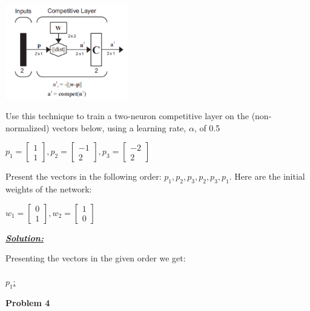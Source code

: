 \documentclass{article}
\begin{document}
\begin{center}
    \includegraphics[width=0.4\textwidth]{pr3.png}
\end{center}

\noindent Use this technique to train a two-neuron competitive layer on the (non-normalized) 
vectors below, using a learning rate, $\alpha$, of 0.5 

\begin{center}
    $p_1 = \begin{bmatrix}
        1\\
        1
      \end{bmatrix}, p_2 = \begin{bmatrix}
        -1\\
        2
      \end{bmatrix}, p_3 = \begin{bmatrix}
        -2 \\
        2
      \end{bmatrix}$
\end{center}

\noindent Present the vectors in the following order: $p_1, p_2, p_3, p_2, p_3, p_1$. 
Here are the initial weights of the network: 

\begin{center}
    $w_1 = \begin{bmatrix}
        0\\
        1
      \end{bmatrix}, w_2 = \begin{bmatrix}
        1\\
        0
      \end{bmatrix}$
      \vspace{1cm}
\end{center}

\noindent \underline{\textbf{\textit{Solution:}}}

\noindent Presenting the vectors in the given order we get: \\\\ \underline{$p_1$:}


\newpage
\noindent \textbf{Problem 4}
\end{document}
